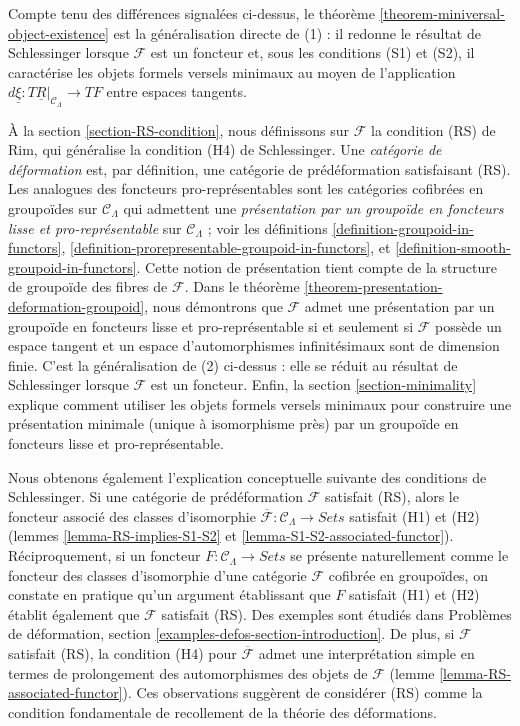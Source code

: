 \medskip\noindent
Compte tenu des différences signalées ci-dessus, le théorème
\ref{theorem-miniversal-object-existence} est la généralisation directe de
(1) : il redonne le résultat de Schlessinger lorsque $\mathcal{F}$ est un
foncteur et, sous les conditions (S1) et (S2), il caractérise les objets
formels versels minimaux au moyen de l'application
$d\underline{\xi} : T\underline{R}|_{\mathcal{C}_\Lambda} \to TF$
entre espaces tangents.

\medskip\noindent
À la section \ref{section-RS-condition}, nous définissons sur $\mathcal{F}$
la condition (RS) de Rim, qui généralise la condition (H4) de Schlessinger.
Une {\it catégorie de déformation} est, par définition, une catégorie de
prédéformation satisfaisant (RS). Les analogues des foncteurs
pro-représentables sont les catégories cofibrées en groupoïdes sur
$\mathcal{C}_\Lambda$ qui admettent une {\it présentation par un groupoïde
en foncteurs lisse et pro-représentable} sur $\mathcal{C}_\Lambda$ ; voir les
définitions \ref{definition-groupoid-in-functors},
\ref{definition-prorepresentable-groupoid-in-functors}, et
\ref{definition-smooth-groupoid-in-functors}.
Cette notion de présentation tient compte de la structure de groupoïde des
fibres de $\mathcal{F}$. Dans le théorème
\ref{theorem-presentation-deformation-groupoid}, nous démontrons que
$\mathcal{F}$ admet une présentation par un groupoïde en foncteurs lisse et
pro-représentable si et seulement si $\mathcal{F}$ possède un espace tangent et un espace
d'automorphismes infinitésimaux sont de dimension finie. C'est la
généralisation de (2) ci-dessus : elle se réduit au résultat de Schlessinger
lorsque $\mathcal{F}$ est un foncteur. Enfin, la section
\ref{section-minimality} explique comment utiliser les objets formels versels
minimaux pour construire une présentation minimale (unique à isomorphisme
près) par un groupoïde en foncteurs lisse et pro-représentable.

\medskip\noindent
Nous obtenons également l'explication conceptuelle suivante des conditions
de Schlessinger. Si une catégorie de prédéformation $\mathcal{F}$ satisfait
(RS), alors le foncteur associé des classes d'isomorphie
$\overline{\mathcal{F}}: \mathcal{C}_\Lambda \to \textit{Sets}$
satisfait (H1) et (H2) (lemmes \ref{lemma-RS-implies-S1-S2} et
\ref{lemma-S1-S2-associated-functor}).
Réciproquement, si un foncteur $F : \mathcal{C}_\Lambda \to \textit{Sets}$
se présente naturellement comme le foncteur des classes d'isomorphie d'une
catégorie $\mathcal{F}$ cofibrée en groupoïdes, on constate en pratique qu'un
argument établissant que $F$ satisfait (H1) et (H2) établit également que
$\mathcal{F}$ satisfait (RS). Des exemples sont étudiés dans Problèmes de
déformation, section
\ref{examples-defos-section-introduction}.
De plus, si $\mathcal{F}$ satisfait (RS), la condition (H4) pour
$\overline{\mathcal{F}}$ admet une interprétation simple en termes de
prolongement des automorphismes des objets de $\mathcal{F}$
(lemme \ref{lemma-RS-associated-functor}). Ces observations suggèrent de
considérer (RS) comme la condition fondamentale de recollement de la théorie
des déformations.




